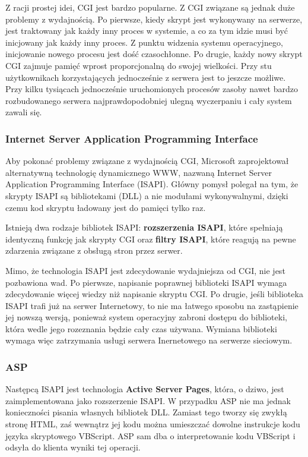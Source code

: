 Z racji prostej idei, CGI jest bardzo popularne. Z CGI związane są jednak duże problemy z wydajnością.
Po pierwsze, kiedy skrypt jest wykonywany na serwerze, jest traktowany jak każdy inny proces w systemie,
a co za tym idzie musi być inicjowany jak każdy inny proces. Z punktu widzenia systemu operacyjnego, inicjowanie
nowego procesu jest dość czasochłonne. Po drugie, każdy nowy skrypt CGI zajmuje pamięć wprost proporcjonalną do
swojej wielkości. Przy stu użytkownikach korzystających jednocześnie z serwera jest to jeszcze możliwe.
Przy kilku tysiącach jednocześnie uruchomionych procesów zasoby nawet bardzo rozbudowanego serwera najprawdopodobniej
ulegną wyczerpaniu i cały system zawali się.

\subsubsection{Internet Server Application Programming Interface}

Aby pokonać problemy związane z wydajnością CGI, Microsoft zaprojektował alternatywną technologię
dynamicznego WWW, nazwaną Internet Server Application Programming Interface (ISAPI). Główny pomysł
polegał na tym, że skrypty ISAPI są bibliotekami (DLL) a nie modułami wykonywalnymi, dzięki czemu
kod skryptu ładowany jest do pamięci tylko raz.

Istnieją dwa rodzaje bibliotek ISAPI: {\bf rozszerzenia ISAPI}, które spełniają identyczną funkcję
jak skrypty CGI oraz {\bf filtry ISAPI}, które reagują na pewne zdarzenia związane z obsługą stron
przez serwer.

Mimo, że technologia ISAPI jest zdecydowanie wydajniejsza od CGI, nie jest pozbawiona wad. Po pierwsze,
napisanie poprawnej biblioteki ISAPI wymaga zdecydowanie więcej wiedzy niż napisanie skryptu CGI.
Po drugie, jeśli biblioteka ISAPI trafi już na serwer Internetowy, to nie ma łatwego sposobu na
zastąpienie jej nowszą wersją, ponieważ system operacyjny zabroni dostępu do biblioteki, która wedle jego
rozeznania będzie cały czas używana. Wymiana biblioteki wymaga więc zatrzymania usługi serwera
Inernetowego na serwerze sieciowym.

\subsubsection{ASP}

Następcą ISAPI jest technologia {\bf Active Server Pages}, która, o dziwo, jest zaimplementowana jako
rozszerzenie ISAPI. W przypadku ASP nie ma jednak konieczności pisania własnych bibliotek DLL. Zamiast
tego tworzy się zwykłą stronę HTML, zaś wewnątrz jej kodu można umieszczać dowolne instrukcje
kodu języka skryptowego VBScript. ASP sam dba o interpretowanie kodu VBScript i odsyła do klienta
wyniki tej operacji.

